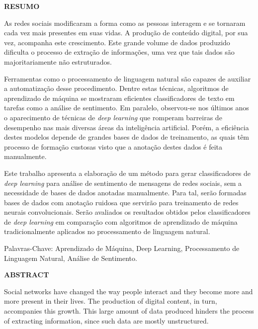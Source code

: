 \pagebreak

\begin{center}
\textbf{RESUMO}
\end{center}
\vspace{0.5cm}

As redes sociais modificaram a forma como as pessoas interagem e se tornaram cada vez mais presentes em suas vidas.
A produção de conteúdo digital, por sua vez, acompanha este crescimento.
Este grande volume de dados produzido dificulta o processo de extração de informações, uma vez que tais dados são
majoritariamente não estruturados.

Ferramentas como o processamento de linguagem natural são capazes de auxiliar a automatização desse procedimento.
Dentre estas técnicas, algoritmos de aprendizado de máquina se mostraram eficientes classificadores de texto em tarefas
como a análise de sentimento.
Em paralelo, observou-se nos últimos anos o aparecimento de técnicas de \textit{deep learning} que romperam barreiras
de desempenho nas mais diversas áreas da inteligência artificial.
Porém, a eficiência destes modelos depende de grandes bases de dados de treinamento, as quais têm processo de formação
custosas visto que a anotação destes dados é feita manualmente.

Este trabalho apresenta a elaboração de um método para gerar classificadores de \textit{deep learning} para análise de
sentimento de mensagens de redes sociais, sem a necessidade de bases de dados anotadas manualmente.
Para tal, serão formadas bases de dados com anotação ruidosa que servirão para treinamento de redes neurais
convolucionais.
Serão avaliados os resultados obtidos pelos classificadores de \textit{deep learning} em comparação com algoritmos de
aprendizado de máquina tradicionalmente aplicados no processamento de linguagem natural.

\vspace{1.0cm}

\noindent Palavras-Chave: Aprendizado de Máquina, Deep Learning, Processamento de Linguagem Natural, Análise de Sentimento.

\pagebreak

\begin{center}
\textbf{ABSTRACT}
\end{center}
\vspace{0.5cm}

Social networks have changed the way people interact and they become more and more present in their lives.
The production of digital content, in turn, accompanies this growth.
This large amount of data produced hinders the process of extracting information, since such data are mostly
unstructured.

